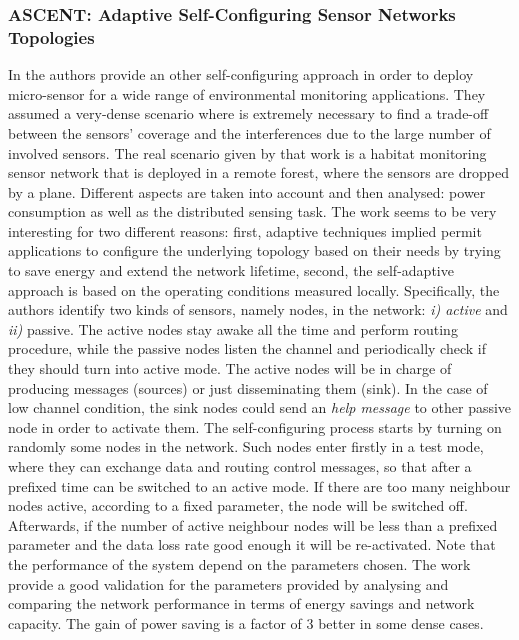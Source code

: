 \subsubsection*{ASCENT: Adaptive Self-Configuring Sensor Networks Topologies}
In \cite{ascent} the authors provide an other self-configuring approach in order
to deploy micro-sensor for a wide range of environmental monitoring
applications. They assumed a very-dense scenario where is extremely necessary to
find a trade-off between the sensors' coverage and the interferences due to the
large number of involved sensors. The real scenario given by that work is a
habitat monitoring sensor network that is deployed in a remote forest, where the
sensors are dropped by a plane.  Different aspects are taken into account and
then analysed: power consumption as well as the distributed sensing task. The
work seems to be very interesting for two different reasons: first, adaptive
techniques implied permit applications to configure the underlying topology
based on their needs by trying to save energy and extend the network lifetime,
second, the self-adaptive approach is based on the operating conditions measured
locally.  Specifically, the authors identify two kinds of sensors, namely nodes,
in the network: \textit{i) active} and \textit{ii)} passive. The active nodes
stay awake all the time and perform routing procedure, while the passive nodes
listen the channel and periodically check if they should turn into active mode.
The active nodes will be in charge of producing messages (sources) or just
disseminating them (sink). In the case of low channel condition, the sink nodes
could send an \textit{help message} to other passive node in order to activate
them.  The self-configuring process starts by turning on randomly some nodes in
the network. Such nodes enter firstly in a test mode, where they can exchange
data and routing control messages, so that after a prefixed time can be switched
to an active mode. If there are too many neighbour nodes active, according to a
fixed parameter, the node will be switched off. Afterwards, if the number of
active neighbour nodes will be less than a prefixed parameter and the data loss
rate good enough it will be re-activated.  Note that the performance of the
system depend on the parameters chosen. The work provide a good validation for
the parameters provided by analysing and comparing the network performance in
terms of energy savings and network capacity. The gain of power saving is a
factor of $3$ better in some dense cases.
